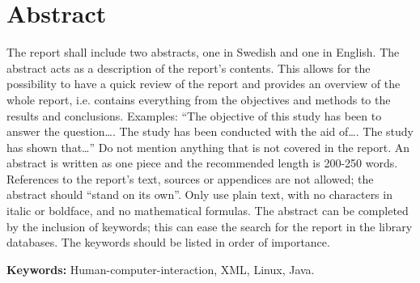 \section*{Abstract}\label{sec:abstract}
The report shall include two abstracts, one in Swedish and one in English. The abstract acts as a description of the report’s contents. This allows for the possibility to have a quick review of the report and provides an overview of the whole report, i.e. contains everything from the objectives and methods to the results and conclusions. Examples: “The objective of this study has been to answer the question\dots. The study has been conducted with the aid of\dots. The study has shown that\dots” Do not mention anything that is not covered in the report. An abstract is written as one piece and the recommended length is 200-250 words. References to the report's text, sources or appendices are not allowed; the abstract should “stand on its own”. Only use plain text, with no characters in italic or boldface, and no mathematical formulas. The abstract can be completed by the inclusion of keywords; this can ease the search for the report in the library databases. The keywords should be listed in order of importance.

\textbf{Keywords:} Human-computer-interaction, XML, Linux, Java. 
